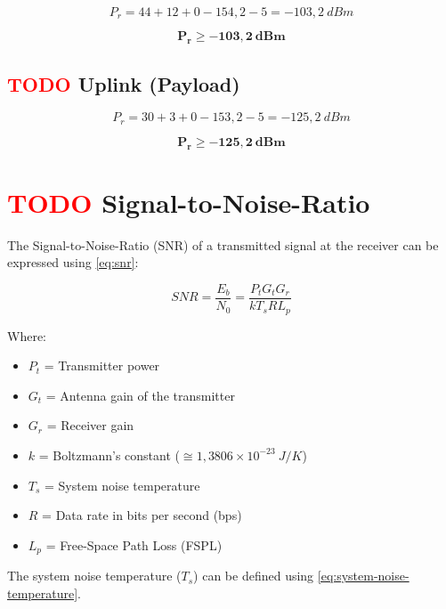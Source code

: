 \begin{equation}
    P_{r} = 44 + 12 + 0 - 154,2 - 5 = -103,2\ dBm
\end{equation}

\begin{equation}
    \mathbf{P_{r} \geq -103,2\ dBm}
\end{equation}

\subsection{ \textcolor{red}{TODO} Uplink (Payload)}

\begin{equation}
    P_{r} = 30 + 3 + 0 - 153,2 - 5 = -125,2\ dBm
\end{equation}

\begin{equation}
    \mathbf{P_{r} \geq -125,2\ dBm}
\end{equation}

\section{ \textcolor{red}{TODO} Signal-to-Noise-Ratio}

The Signal-to-Noise-Ratio (SNR) of a transmitted signal at the receiver can be expressed using \autoref{eq:snr}:

\begin{equation} \label{eq:snr}
    SNR = \frac{E_{b}}{N_{0}} = \frac{P_{t}G_{t}G_{r}}{kT_{s}RL_{p}}
\end{equation}

Where:

\begin{itemize}
    \item $P_{t}$ = Transmitter power
    \item $G_{t}$ = Antenna gain of the transmitter
    \item $G_{r}$ = Receiver gain
    \item $k$ = Boltzmann's constant ($\cong 1,3806 \times 10^{-23}\ J/K$)
    \item $T_{s}$ = System noise temperature
    \item $R$ = Data rate in bits per second (bps)
    \item $L_{p}$ = Free-Space Path Loss (FSPL)
\end{itemize}

The system noise temperature ($T_{s}$) can be defined using \autoref{eq:system-noise-temperature}.

